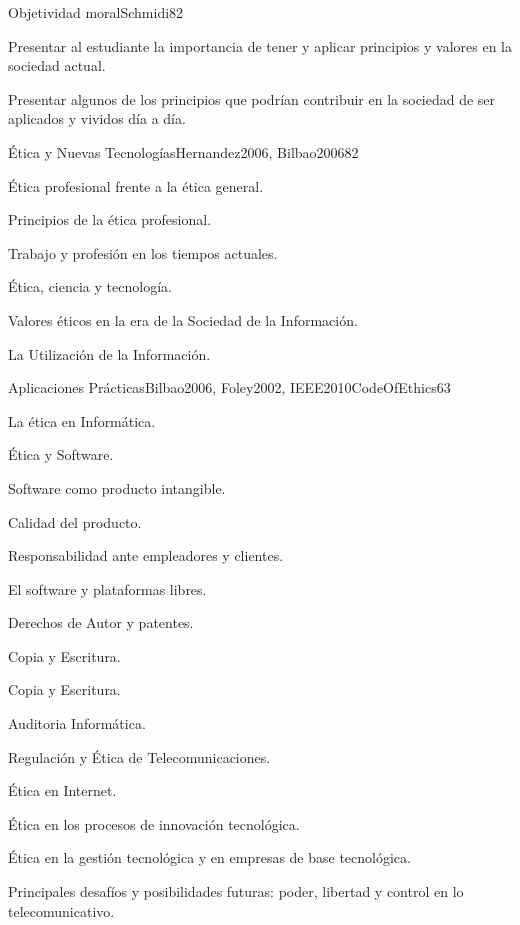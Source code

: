 \begin{syllabus}
\begin{unit}{Objetividad moral}{Schmidi}{8}{2}
\begin{learningoutcomes}
	\item Presentar al estudiante la importancia de tener y aplicar principios y valores en la sociedad actual.
	\item Presentar algunos de los principios que podrían contribuir en la sociedad de ser aplicados y vividos día a día.
\end{learningoutcomes}
\end{unit}

\begin{unit}{Ética y Nuevas Tecnologías}{Hernandez2006, Bilbao2006}{8}{2}
\begin{topics}
      \item Ética profesional frente a la ética general.
      \item Principios de la ética profesional.
      \item Trabajo y profesión en los tiempos actuales.
      \item Ética, ciencia y tecnología.
      \item Valores éticos en la era de la Sociedad de la Información.
      \item La Utilización de la Información.
\end{topics}
\end{unit}

\begin{unit}{Aplicaciones Prácticas}{Bilbao2006, Foley2002, IEEE2010CodeOfEthics}{6}{3}
\begin{topics}
      \item La ética en Informática.
      \item Ética y Software.
      \item Software como producto intangible.
      \item Calidad del producto.
      \item Responsabilidad ante empleadores y clientes.
      \item El software y plataformas libres.
      \item Derechos de Autor y patentes.
      \item Copia y Escritura.
      \item Copia y Escritura.
      \item Auditoria Informática.
      \item Regulación y Ética de Telecomunicaciones.
      \item Ética en Internet.
      \item Ética en los procesos de innovación tecnológica.
      \item Ética en la gestión tecnológica y en empresas de base tecnológica.
      \item Principales desafíos y posibilidades futuras: poder, libertad y control en lo telecomunicativo.
\end{topics}
\end{unit}



\begin{coursebibliography}
\end{coursebibliography}

\end{syllabus}
